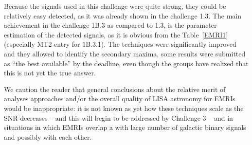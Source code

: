 \documentclass{iopart}
\begin{document}
Because the signals used in this challenge were quite strong, they could be relatively easy detected, as it was already 
shown in the challenge 1.3. The main achievement in the challenge 1B.3 as compared to 1.3, is the parameter estimation of the detected signals, as it is obvious from the Table~\ref{EMRI1} (especially MT2 entry for 1B.3.1). The techniques were 
significantly improved and they allowed to identify the secondary maxima, some results were submitted as ``the best available'' by the deadline, even though the groups have realized that this is not yet the true answer.  

 We caution the reader that general conclusions about the relative merit of analyses approaches and/or the overall quality of LISA astronomy for EMRIs would be inappropriate: it is not known as yet how these techniques scale as the SNR decreases -- and this will begin to be addressed by Challenge 3 -- and in situations in which EMRIs overlap a with large number of galactic binary signals and possibly with each other.
 
\end{document}
